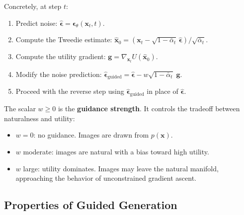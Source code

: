\documentclass[11pt]{article}
\newcommand{\xb}{\mathbf{x}}
\newcommand{\eb}{\boldsymbol{\epsilon}}
\newcommand{\alphabar}{\bar{\alpha}}
\begin{document}
  Concretely, at step $t$:
  \begin{enumerate}[nosep]
      \item Predict noise: $\hat{\eb} = \eb_\theta(\xb_t, t)$.
      \item Compute the Tweedie estimate:
            $\hat{\xb}_0 = (\xb_t - \sqrt{1 - \alphabar_t}\,\hat{\eb})
            / \sqrt{\alphabar_t}$.
      \item Compute the utility gradient: $\mathbf{g} = \nabla_{\xb_t}
            U(\hat{\xb}_0)$.
      \item Modify the noise prediction:
            $\hat{\eb}_{\mathrm{guided}} = \hat{\eb}
            - w \sqrt{1 - \alphabar_t} \; \mathbf{g}$.
      \item Proceed with the reverse step using
            $\hat{\eb}_{\mathrm{guided}}$ in place of $\hat{\eb}$.
  \end{enumerate}

  The scalar $w \geq 0$ is the \textbf{guidance strength}. It controls the
  tradeoff between naturalness and utility:
  \begin{itemize}[nosep]
      \item $w = 0$: no guidance. Images are drawn from $p(\xb)$.
      \item $w$ moderate: images are natural with a bias toward high utility.
      \item $w$ large: utility dominates. Images may leave the natural
            manifold, approaching the behavior of unconstrained gradient ascent.
  \end{itemize}

  \subsection{Properties of Guided Generation}
\end{document}

